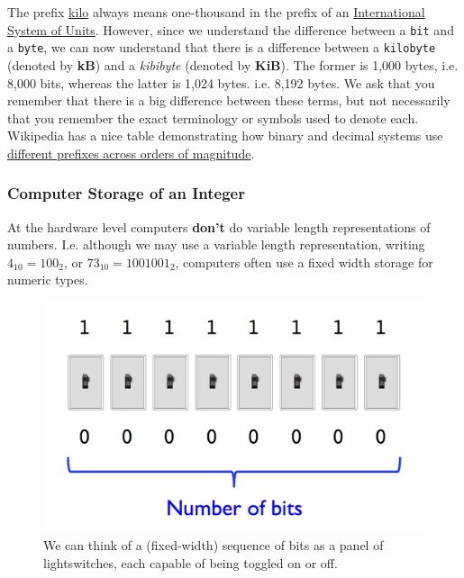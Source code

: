 \documentclass[12pt,letterpaper,twoside]{article}
\begin{document}
The prefix
\href{https://en.wikipedia.org/wiki/Kilobyte#Definitions_and_usage}{kilo}
always means one-thousand in the prefix of an
\href{https://en.wikipedia.org/wiki/International_System_of_Units#Prefixes}{International
  System of Units}. However, since we understand the difference
between a \texttt{bit} and a \texttt{byte}, we can now understand that
there is a difference between a \texttt{kilobyte} (denoted by \textbf{kB}) and
a \emph{kibibyte} (denoted by \textbf{KiB}). The former is 1,000 bytes, i.e. 8,000
bits, whereas the latter is 1,024 bytes. i.e. 8,192 bytes.
We ask that you remember that there is a big difference between these
terms, but not necessarily that you remember the exact terminology or
symbols used to denote each. Wikipedia has a nice table demonstrating
how binary and decimal systems use
\href{https://en.wikipedia.org/wiki/Orders_of_magnitude_(data)}{different prefixes across orders of magnitude}. 

\subsubsection{Computer Storage of an Integer}
At the hardware level computers \textbf{don't} do variable length
representations of numbers. I.e. although we may use a variable length
representation, writing $4_{10} = 100_2$, or $73_{10} = 1001001_2$,
computers often use a fixed width storage for numeric types.

\begin{figure}[!h]
\centering
\includegraphics[scale=0.35]{fig/bits.png}
\caption{\footnotesize We can think of a (fixed-width) sequence of bits as a panel
  of lightswitches, each capable of being toggled on or off. }
\end{figure}
\end{document}
